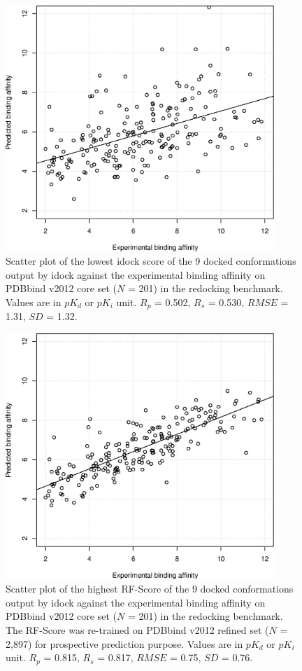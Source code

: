 \begin{figure}[!ht]
\begin{center}
\includegraphics[width=4in]{../istar/pK-idockConf1idock.eps}
\end{center}
\caption{Scatter plot of the lowest idock score of the 9 docked conformations output by idock against the experimental binding affinity on PDBbind v2012 core set ($N$ = 201) in the redocking benchmark. Values are in $pK_d$ or $pK_i$ unit. $R_p$ = 0.502, $R_s$ = 0.530, $RMSE$ = 1.31, $SD$ = 1.32.}
\label{pK-idockConf1idock}
\end{figure}

\begin{figure}[!ht]
\begin{center}
\includegraphics[width=4in]{../istar/pK-idockConfsRFScoreMax.eps}
\end{center}
\caption{Scatter plot of the highest RF-Score of the 9 docked conformations output by idock against the experimental binding affinity on PDBbind v2012 core set ($N$ = 201) in the redocking benchmark. The RF-Score was re-trained on PDBbind v2012 refined set ($N$ = 2,897) for prospective prediction purpose. Values are in $pK_d$ or $pK_i$ unit. $R_p$ = 0.815, $R_s$ = 0.817, $RMSE$ = 0.75, $SD$ = 0.76.}
\label{pK-idockConfsRFScoreMax}
\end{figure}

